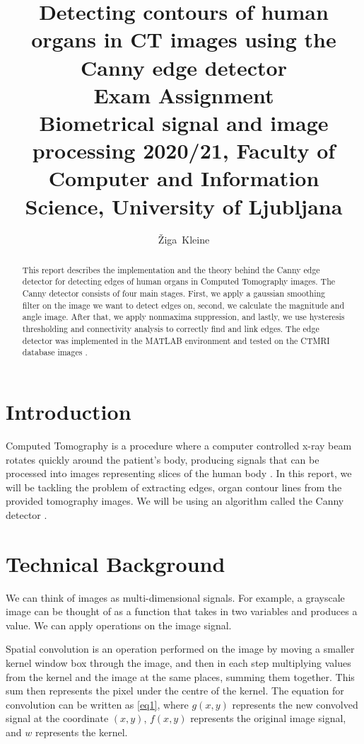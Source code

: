 \documentclass[9pt]{IEEEtran}
\title{\vspace{0ex} %
Detecting contours of human organs in CT images using the Canny edge detector
\\ \large{Exam Assignment}\\ \normalsize{Biometrical signal and image processing 2020/21, Faculty of Computer and Information Science, University of Ljubljana}}
\author{ %
Žiga~Kleine
\vspace{-4.0ex}
}
\begin{document}
\maketitle

\begin{abstract}

This report describes the implementation and the theory behind the Canny edge detector for detecting edges of human organs in Computed Tomography images. The Canny detector consists of four main stages. First, we apply a gaussian smoothing filter on the image we want to detect edges on, second, we calculate the magnitude and angle image. After that, we apply nonmaxima suppression, and lastly, we use hysteresis thresholding and connectivity analysis to correctly find and link edges. The edge detector was implemented in the MATLAB environment and tested on the CTMRI database images \cite{ctmri}.

\end{abstract}

\section{Introduction}

Computed Tomography is a procedure where a computer controlled x-ray beam rotates quickly around the patient's body, producing signals that can be processed into images representing slices of the human body \cite{kalender2006x}. In this report, we will be tackling the problem of extracting edges, organ contour lines from the provided tomography images. We will be using an algorithm called the Canny detector \cite{mcilhagga2011canny}.

\section{Technical Background}

We can think of images as multi-dimensional signals. For example, a grayscale image can be thought of as a function that takes in two variables and produces a value. We can apply operations on the image signal.

Spatial convolution is an operation performed on the image by moving a smaller kernel window box through the image, and then in each step multiplying values from the kernel and the image at the same places, summing them together. This sum then represents the pixel under the centre of the kernel. The equation for convolution can be written as \ref{eq1}, where $g(x, y)$ represents the new convolved signal at the coordinate $(x, y)$, $f(x, y)$ represents the original image signal, and $w$ represents the kernel.
 
\end{document}
